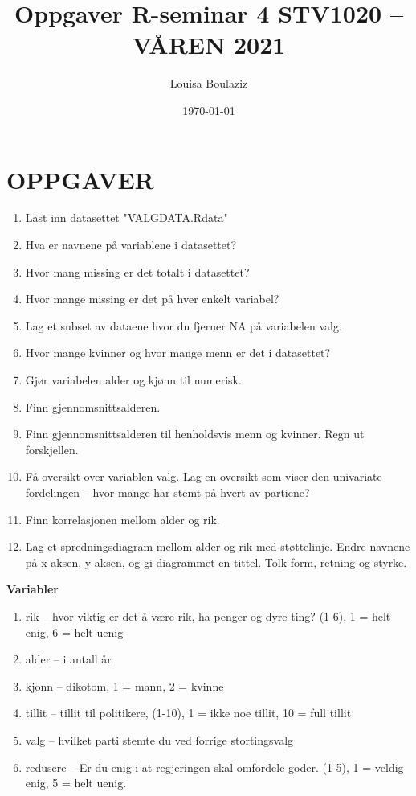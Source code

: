 \documentclass{article}\usepackage[]{graphicx}\usepackage[]{color}
\title{Oppgaver R-seminar 4
  \linebreak STV1020 -- VÅREN 2021}
\author{Louisa Boulaziz}
\date{\today}
\begin{document}
\maketitle

\section{OPPGAVER}
\begin{enumerate}
\item Last inn datasettet "VALGDATA.Rdata"
\item Hva er navnene på variablene i datasettet? 
\item Hvor mang missing er det totalt i datasettet?
\item Hvor mange missing er det på hver enkelt variabel?
\item Lag et subset av dataene hvor du fjerner NA på variabelen valg.
\item Hvor mange kvinner og hvor mange menn er det i datasettet?
\item Gjør variabelen alder og kjønn til numerisk.
\item Finn gjennomsnittsalderen. 
\item Finn gjennomsnittsalderen til henholdsvis menn og kvinner. Regn ut forskjellen.
\item Få oversikt over variablen valg. Lag en oversikt som viser den univariate fordelingen -- hvor mange har stemt på hvert av partiene?
\item Finn korrelasjonen mellom alder og rik. 
\item Lag et spredningsdiagram mellom alder og rik med støttelinje. Endre navnene på x-aksen, y-aksen, og gi diagrammet en tittel. Tolk form, retning og styrke.


\end{enumerate}

\hfill \break \textbf{Variabler}
\begin{enumerate}
\item rik -- hvor viktig er det å være rik, ha penger og dyre ting? (1-6), 1 = helt enig, 6 = helt uenig 
\item alder -- i antall år
\item kjonn -- dikotom, 1 = mann, 2 = kvinne
\item tillit -- tillit til politikere, (1-10), 1 = ikke noe tillit, 10 = full tillit
\item valg -- hvilket parti stemte du ved forrige stortingsvalg
\item redusere -- Er du enig i at regjeringen skal omfordele goder. (1-5), 1 = veldig enig, 5 = helt uenig.
\end{enumerate}
\end{document}
